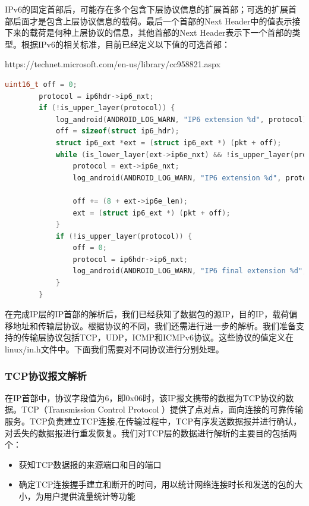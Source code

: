 \documentclass[format=final, language=chinese, degree=fyp]{hustthesis}
\begin{document}
IPv6的固定首部后，可能存在多个包含下层协议信息的扩展首部；可选的扩展首部后面才是包含上层协议信息的载荷。最后一个首部的Next Header中的值表示接下来的载荷是何种上层协议的信息，其他首部的Next Header表示下一个首部的类型。根据IPv6的相关标准，目前已经定义以下值的可选首部：



https://technet.microsoft.com/en-us/library/cc958821.aspx


\begin{lstlisting}[language=c]
        uint16_t off = 0;
        protocol = ip6hdr->ip6_nxt;
        if (!is_upper_layer(protocol)) {
            log_android(ANDROID_LOG_WARN, "IP6 extension %d", protocol);
            off = sizeof(struct ip6_hdr);
            struct ip6_ext *ext = (struct ip6_ext *) (pkt + off);
            while (is_lower_layer(ext->ip6e_nxt) && !is_upper_layer(protocol)) {
                protocol = ext->ip6e_nxt;
                log_android(ANDROID_LOG_WARN, "IP6 extension %d", protocol);

                off += (8 + ext->ip6e_len);
                ext = (struct ip6_ext *) (pkt + off);
            }
            if (!is_upper_layer(protocol)) {
                off = 0;
                protocol = ip6hdr->ip6_nxt;
                log_android(ANDROID_LOG_WARN, "IP6 final extension %d", protocol);
            }
        }
\end{lstlisting}

在完成IP层的IP首部的解析后，我们已经获知了数据包的源IP，目的IP，载荷偏移地址和传输层协议。根据协议的不同，我们还需进行进一步的解析。我们准备支持的传输层协议包括TCP，UDP，ICMP和ICMPv6协议。这些协议的值定义在linux/in.h文件中。下面我们需要对不同协议进行分别处理。

\subsubsection{TCP协议报文解析}

在IP首部中，协议字段值为6，即0x06时，该IP报文携带的数据为TCP协议的数据。TCP（Transmission Control Protocol ）提供了点对点，面向连接的可靠传输服务。TCP负责建立TCP连接,在传输过程中，TCP有序发送数据报并进行确认，对丢失的数据报进行重发恢复。我们对TCP层的数据进行解析的主要目的包括两个：
    
    \begin{itemize}
       	\item 获知TCP数据报的来源端口和目的端口
       	\item 确定TCP连接握手建立和断开的时间，用以统计网络连接时长和发送的包的大小，为用户提供流量统计等功能
    \end{itemize}
    
\end{document}
